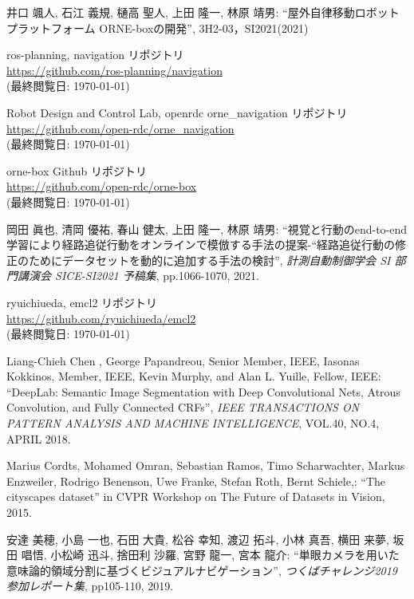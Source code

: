 \documentclass[uplatex, twocolumn, 9pt]{jsproceedings}
\begin{document}

\footnotesize
\begin{thebibliography}{99}

井口 颯人, 石江 義規, 樋高 聖人, 上田 隆一, 林原 靖男: ``屋外自律移動ロボットプラットフォーム ORNE-boxの開発'', 3H2-03，SI2021(2021)

ros-planning, navigation リポジトリ\\
\url{https://github.com/ros-planning/navigation}\\
(最終閲覧日: \today)

Robot Design and Control Lab, openrdc orne\_navigation リポジトリ\\
\url{https://github.com/open-rdc/orne_navigation}\\
(最終閲覧日: \today)

orne-box Github リポジトリ\\
\url{https://github.com/open-rdc/orne-box}\\
(最終閲覧日: \today)

岡田 眞也, 清岡 優祐, 春山 健太, 上田 隆一, 林原 靖男: ``視覚と行動のend-to-end学習により経路追従行動をオンラインで模倣する手法の提案-“経路追従行動の修正のためにデータセットを動的に追加する手法の検討'', \textit{計測自動制御学会 SI 部門講演会 SICE-SI2021 予稿集}, pp.1066-1070, 2021.

ryuichiueda, emcl2 リポジトリ\\
\url{https://github.com/ryuichiueda/emcl2}\\
(最終閲覧日: \today)

Liang-Chieh Chen , George Papandreou, Senior Member, IEEE, Iasonas Kokkinos, Member, IEEE,
Kevin Murphy, and Alan L. Yuille, Fellow, IEEE: ``DeepLab: Semantic Image Segmentation with
Deep Convolutional Nets, Atrous Convolution, and Fully Connected CRFs'', \textit{IEEE TRANSACTIONS ON PATTERN ANALYSIS AND MACHINE INTELLIGENCE}, VOL.40, NO.4, APRIL 2018.

Marius Cordts, Mohamed Omran, Sebastian Ramos, Timo Scharwachter, Markus Enzweiler, Rodrigo Benenson, Uwe Franke, Stefan Roth, Bernt Schiele,: ``The cityscapes dataset'' in CVPR Workshop on The Future of Datasets in Vision, 2015.

安達 美穂, 小島 一也, 石田 大貴, 松谷 幸知, 渡辺 拓斗, 小林 真吾, 横田 来夢, 坂田 唱悟, 小松崎 迅斗, 捨田利 沙羅, 宮野 龍一, 宮本 龍介: ``単眼カメラを用いた意味論的領域分割に基づくビジュアルナビゲーション'', \textit{つくばチャレンジ2019 参加レポート集}, pp105-110, 2019.


\end{thebibliography}
\end{document}
